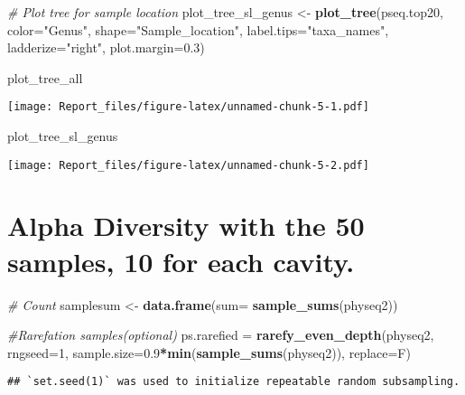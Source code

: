 \documentclass[]{article}
\newenvironment{Shaded}{\begin{snugshade}}{\end{snugshade}}
\newcommand{\CommentTok}[1]{\textcolor[rgb]{0.56,0.35,0.01}{\textit{#1}}}
\newcommand{\DataTypeTok}[1]{\textcolor[rgb]{0.13,0.29,0.53}{#1}}
\newcommand{\DecValTok}[1]{\textcolor[rgb]{0.00,0.00,0.81}{#1}}
\newcommand{\FloatTok}[1]{\textcolor[rgb]{0.00,0.00,0.81}{#1}}
\newcommand{\KeywordTok}[1]{\textcolor[rgb]{0.13,0.29,0.53}{\textbf{#1}}}
\newcommand{\NormalTok}[1]{#1}
\newcommand{\OperatorTok}[1]{\textcolor[rgb]{0.81,0.36,0.00}{\textbf{#1}}}
\newcommand{\StringTok}[1]{\textcolor[rgb]{0.31,0.60,0.02}{#1}}
\begin{document}
\begin{Shaded}
\begin{Highlighting}[]
\CommentTok{# Plot tree for sample location}
\NormalTok{plot_tree_sl_genus <-}\StringTok{ }\KeywordTok{plot_tree}\NormalTok{(pseq.top20, }\DataTypeTok{color=}\StringTok{"Genus"}\NormalTok{, }\DataTypeTok{shape=}\StringTok{"Sample_location"}\NormalTok{, }\DataTypeTok{label.tips=}\StringTok{"taxa_names"}\NormalTok{, }\DataTypeTok{ladderize=}\StringTok{"right"}\NormalTok{, }\DataTypeTok{plot.margin=}\FloatTok{0.3}\NormalTok{)}

\NormalTok{plot_tree_all}
\end{Highlighting}
\end{Shaded}

\texttt{[image: Report\_files/figure-latex/unnamed-chunk-5-1.pdf]}

\begin{Shaded}
\begin{Highlighting}[]
\NormalTok{plot_tree_sl_genus}
\end{Highlighting}
\end{Shaded}

\texttt{[image: Report\_files/figure-latex/unnamed-chunk-5-2.pdf]}

\hypertarget{alpha-diversity-with-the-50-samples-10-for-each-cavity.}{%
\section{Alpha Diversity with the 50 samples, 10 for each
cavity.}\label{alpha-diversity-with-the-50-samples-10-for-each-cavity.}}

\begin{Shaded}
\begin{Highlighting}[]
\CommentTok{# Count}
\NormalTok{samplesum <-}\StringTok{ }\KeywordTok{data.frame}\NormalTok{(}\DataTypeTok{sum=} \KeywordTok{sample_sums}\NormalTok{(physeq2))}

\CommentTok{#Rarefation samples(optional)}
\NormalTok{ps.rarefied =}\StringTok{ }\KeywordTok{rarefy_even_depth}\NormalTok{(physeq2, }\DataTypeTok{rngseed=}\DecValTok{1}\NormalTok{, }\DataTypeTok{sample.size=}\FloatTok{0.9}\OperatorTok{*}\KeywordTok{min}\NormalTok{(}\KeywordTok{sample_sums}\NormalTok{(physeq2)), }\DataTypeTok{replace=}\NormalTok{F)}
\end{Highlighting}
\end{Shaded}

\begin{verbatim}
## `set.seed(1)` was used to initialize repeatable random subsampling.
\end{verbatim}
\end{document}
